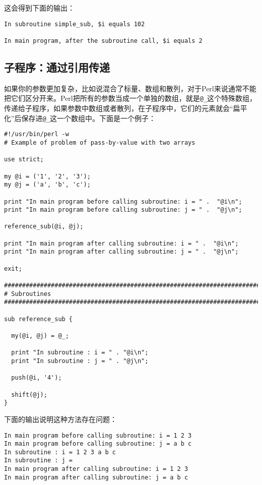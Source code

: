 这会得到下面的输出：

\begin{lstlisting}
In subroutine simple_sub, $i equals 102

In main program, after the subroutine call, $i equals 2
\end{lstlisting}

\subsection{子程序：通过引用传递}
如果你的参数更加复杂，比如说混合了标量、数组和散列，对于Perl来说通常不能把它们区分开来。Perl把所有的参数当成一个单独的数组，就是\verb|@_|这个特殊数组，传递给子程序，如果参数中数组或者散列，在子程序中，它们的元素就会“扁平化”后保存进\verb|@_|这一个数组中。下面是一个例子：

\begin{lstlisting}
#!/usr/bin/perl -w
# Example of problem of pass-by-value with two arrays

use strict;

my @i = ('1', '2', '3');
my @j = ('a', 'b', 'c');

print "In main program before calling subroutine: i = " .  "@i\n";
print "In main program before calling subroutine: j = " .  "@j\n";

reference_sub(@i, @j);

print "In main program after calling subroutine: i = " .  "@i\n";
print "In main program after calling subroutine: j = " .  "@j\n";

exit;

################################################################################
# Subroutines
################################################################################

sub reference_sub {

  my(@i, @j) = @_;

  print "In subroutine : i = " . "@i\n";
  print "In subroutine : j = " . "@j\n";

  push(@i, '4');

  shift(@j);
}
\end{lstlisting}

下面的输出说明这种方法存在问题：

\begin{lstlisting}
In main program before calling subroutine: i = 1 2 3
In main program before calling subroutine: j = a b c
In subroutine : i = 1 2 3 a b c
In subroutine : j = 
In main program after calling subroutine: i = 1 2 3
In main program after calling subroutine: j = a b c
\end{lstlisting}

